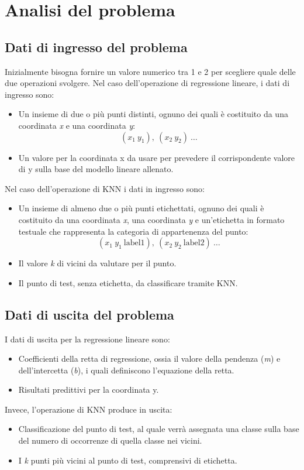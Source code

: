 \documentclass[11pt]{article}
\theoremstyle{definition}
\begin{document}
\newpage

\section{Analisi del problema}

\subsection{Dati di ingresso del problema}
Inizialmente bisogna fornire un valore numerico tra 1 e 2 per scegliere quale delle due operazioni svolgere. Nel caso dell'operazione di regressione lineare, i dati di ingresso sono:
\begin{itemize}
\item Un insieme di due o più punti distinti, ognuno dei quali è costituito da una coordinata \textit{x} e una coordinata \textit{y}:
$$(x_1 \ y_1),\  (x_2 \ y_2) \ \dots $$
\item Un valore per la coordinata x da usare per prevedere il corrispondente valore di y sulla base del modello lineare allenato.
\end{itemize}
Nel caso dell'operazione di KNN i dati in ingresso sono:
\begin{itemize}
\item Un insieme di almeno due o più punti etichettati, ognuno dei quali è costituito da una coordinata \textit{x}, una coordinata \textit{y} e un'etichetta in formato testuale che rappresenta la categoria di appartenenza del punto:
$$
(x_1 \ y_1 \ \text{label1}),\  (x_2 \ y_2 \ \text{label2}) \ \dots 
$$
\item Il valore \textit{k} di vicini da valutare per il punto.
\item Il punto di test, senza etichetta, da classificare tramite KNN.
\end{itemize}

\subsection{Dati di uscita del problema}
I dati di uscita per la regressione lineare sono:
\begin{itemize}
\item Coefficienti della retta di regressione, ossia il valore della pendenza (\textit{m}) e dell'intercetta (\textit{b}), i quali definiscono l'equazione della retta.
\item Risultati predittivi per la coordinata y.
\end{itemize}
Invece, l'operazione di KNN produce in uscita:
\begin{itemize}
\item Classificazione del punto di test, al quale verrà assegnata una classe sulla base del numero di occorrenze di quella classe nei vicini.
\item I \textit{k} punti più vicini al punto di test, comprensivi di etichetta.
\end{itemize}
\end{document}
